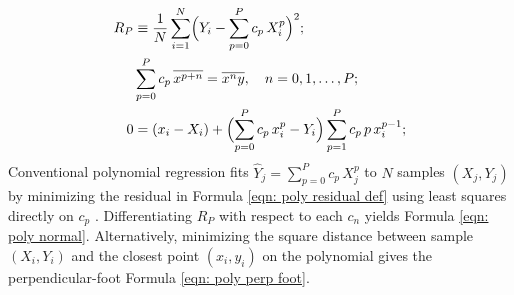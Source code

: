 \documentclass[twoside]{article}
\numberwithin{equation}{section}
\begin{document}
\begin{align}
\label{eqn: poly residual def}
R_P &\equiv \frac{1}{N} \sum_{i=1}^N \Bigl( Y_i - \sum_{p=0}^{P} c_p\, X_i^p \Bigr)^2; \\
\label{eqn: poly normal}
&\sum_{p=0}^{P} c_p\, \overline{x^{p+n}} = \overline{x^n y}, \quad n = 0, 1, \dots, P; \\
\label{eqn: poly perp foot}
0 &= (x_i - X_i) + \Bigl( \sum_{p=0}^{P} c_p\, x_i^p - Y_i \Bigr) \sum_{p=1}^{P} c_p\, p\, x_i^{p - 1};
\end{align}
Conventional polynomial regression fits $\hat{Y}_j = \sum_{p=0}^{P} c_p\, X_j^p$ to $N$ samples $(X_j, Y_j)$ by minimizing the residual in Formula \eqref{eqn: poly residual def} using least squares directly on $c_p$ \cite{Numerical_Recipes}. Differentiating $R_P$ with respect to each $c_n$ yields Formula \eqref{eqn: poly normal}.
Alternatively, minimizing the square distance between sample $(X_i, Y_i)$ and the closest point $(x_i, y_i)$ on the polynomial gives the perpendicular-foot Formula \eqref{eqn: poly perp foot}.
\end{document}
